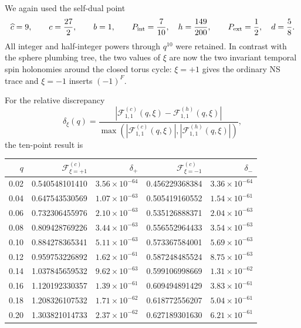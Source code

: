 \documentclass[11pt]{article}
\newcommand{\F}{\mathcal F}
\begin{document}
We again used the self-dual point
\begin{equation}
 \widehat c=9,\qquad c=\frac{27}{2},\qquad b=1,
 \qquad
 P_{\rm int}=\frac7{10},\quad h=\frac{149}{200},
 \qquad
 P_{\rm ext}=\frac12,\quad d=\frac58.
 \label{eq:torus-order-ten-benchmark}
\end{equation}
All integer and half-integer powers through \(q^{10}\) were retained.  In
contrast with the sphere plumbing tree, the two values of \(\xi\) are now
the two invariant temporal spin holonomies around the closed torus cycle:
\(\xi=+1\) gives the ordinary NS trace and \(\xi=-1\) inserts
\((-1)^F\).

For the relative discrepancy
\begin{equation}
 \delta_\xi(q)
 =\frac{\left|\F_{1,1}^{(c)}(q,\xi)
                  -\F_{1,1}^{(h)}(q,\xi)\right|}
        {\max\!\left(\left|\F_{1,1}^{(c)}(q,\xi)\right|,
                     \left|\F_{1,1}^{(h)}(q,\xi)\right|\right)},
 \label{eq:torus-c-h-relative-error}
\end{equation}
the ten-point result is
\begin{center}
\scriptsize
\begin{tabular}{@{}rrrrr@{}}
\toprule
\(q\) & \(\F_{\xi=+1}^{(c)}\) & \(\delta_{+}\)
      & \(\F_{\xi=-1}^{(c)}\) & \(\delta_{-}\)\\
\midrule
0.02 & 0.540548101410 & \(3.56\times10^{-64}\)
     & 0.456229368384 & \(3.36\times10^{-64}\)\\
0.04 & 0.647543530569 & \(1.07\times10^{-63}\)
     & 0.505419160552 & \(1.54\times10^{-61}\)\\
0.06 & 0.732306455976 & \(2.10\times10^{-63}\)
     & 0.535126888371 & \(2.04\times10^{-63}\)\\
0.08 & 0.809428769226 & \(3.44\times10^{-63}\)
     & 0.556552964433 & \(3.54\times10^{-63}\)\\
0.10 & 0.884278365341 & \(5.11\times10^{-63}\)
     & 0.573367584001 & \(5.69\times10^{-63}\)\\
0.12 & 0.959753226892 & \(1.62\times10^{-61}\)
     & 0.587248485524 & \(8.75\times10^{-63}\)\\
0.14 & 1.037845659532 & \(9.62\times10^{-63}\)
     & 0.599106998669 & \(1.31\times10^{-62}\)\\
0.16 & 1.120192330357 & \(1.39\times10^{-61}\)
     & 0.609494891429 & \(3.83\times10^{-61}\)\\
0.18 & 1.208326107532 & \(1.71\times10^{-62}\)
     & 0.618772556207 & \(5.04\times10^{-61}\)\\
0.20 & 1.303821014733 & \(2.37\times10^{-62}\)
     & 0.627189301630 & \(6.21\times10^{-61}\)\\
\bottomrule
\end{tabular}
\end{center}
\end{document}
